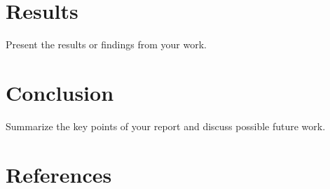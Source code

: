 \documentclass[12pt,a4paper]{report}
\begin{document}
	
	\chapter{Results}
	Present the results or findings from your work.
	
	\chapter{Conclusion}
	Summarize the key points of your report and discuss possible future work.
	
	\chapter*{References}
	
	
\end{document}
